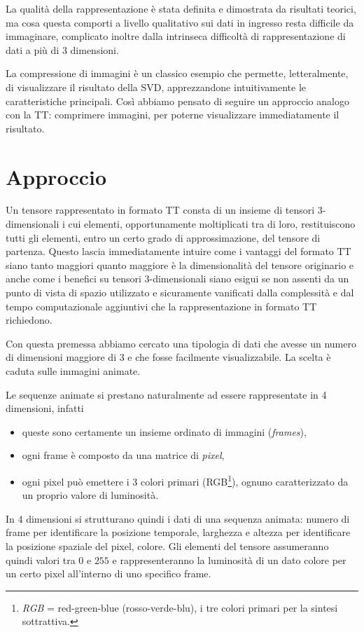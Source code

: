 \documentclass[11pt,a4paper]{article}
\begin{document}
  La qualità della rappresentazione è stata definita e dimostrata da risultati teorici, ma cosa questa comporti a livello qualitativo sui dati in ingresso resta difficile da immaginare, complicato inoltre dalla intrinseca difficoltà di rappresentazione di dati a più di 3 dimensioni.

  La compressione di immagini è un classico esempio che permette, letteralmente, di visualizzare il risultato della SVD, apprezzandone intuitivamente le caratteristiche principali. Così abbiamo pensato di seguire un approccio analogo con la TT: comprimere immagini, per poterne visualizzare immediatamente il risultato.

\section{Approccio}
Un tensore rappresentato in formato TT consta di un insieme di tensori 3-dimensionali i cui elementi, opportunamente moltiplicati tra di loro, restituiscono tutti gli elementi, entro un certo grado di approssimazione, del tensore di partenza.
Questo lascia immediatamente intuire come i vantaggi del formato TT siano tanto maggiori quanto maggiore è la dimensionalità del tensore originario e anche come i benefici su tensori 3-dimensionali siano esigui se non assenti da un punto di vista di spazio utilizzato e sicuramente vanificati dalla complessità e dal tempo computazionale aggiuntivi che la rappresentazione in formato TT richiedono.

Con questa premessa abbiamo cercato una tipologia di dati che avesse un numero di dimensioni maggiore di 3 e che fosse facilmente visualizzabile. La scelta è caduta sulle immagini animate.

Le sequenze animate si prestano naturalmente ad essere rappresentate in 4 dimensioni, infatti
\begin{itemize}
\item queste sono certamente un insieme ordinato di immagini (\emph{frames}),
\item ogni frame è composto da una matrice di \emph{pixel},
\item ogni pixel può emettere i 3 colori primari (RGB\footnote{\emph{RGB} = red-green-blue (rosso-verde-blu), i tre colori primari per la sintesi sottrattiva.}), ognuno caratterizzato da un proprio valore di luminosità.
\end{itemize}
In 4 dimensioni si strutturano quindi i dati di una sequenza animata: numero di frame per identificare la posizione temporale, larghezza e altezza per identificare la posizione spaziale del pixel, colore. Gli elementi del tensore assumeranno quindi valori tra $0$ e $255$ e rappresenteranno la luminosità di un dato colore per un certo pixel all'interno di uno specifico frame.
\end{document}
